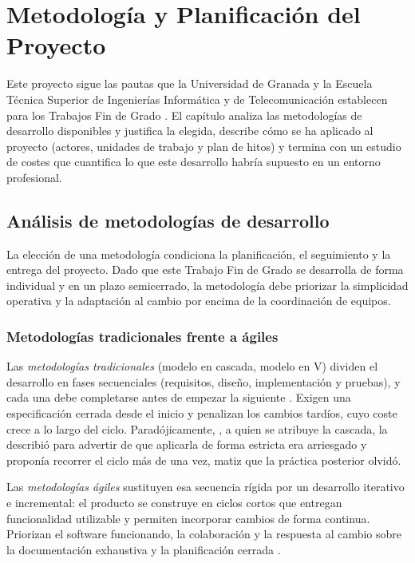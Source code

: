 \chapter{Metodología y Planificación del Proyecto}
\label{cap:metodologia}

Este proyecto sigue las pautas que la Universidad de Granada y la Escuela Técnica Superior de Ingenierías Informática y de Telecomunicación establecen para los Trabajos Fin de Grado \citep{GuiaTFG, GuillenPerales2025}. El capítulo analiza las metodologías de desarrollo disponibles y justifica la elegida, describe cómo se ha aplicado al proyecto (actores, unidades de trabajo y plan de hitos) y termina con un estudio de costes que cuantifica lo que este desarrollo habría supuesto en un entorno profesional.

\section{Análisis de metodologías de desarrollo}

La elección de una metodología condiciona la planificación, el seguimiento y la entrega del proyecto. Dado que este Trabajo Fin de Grado se desarrolla de forma individual y en un plazo semicerrado, la metodología debe priorizar la simplicidad operativa y la adaptación al cambio por encima de la coordinación de equipos.

\subsection{Metodologías tradicionales frente a ágiles}

Las \textit{metodologías tradicionales} (modelo en cascada, modelo en V) dividen el desarrollo en fases secuenciales (requisitos, diseño, implementación y pruebas), y cada una debe completarse antes de empezar la siguiente \citep{Sommerville2016}. Exigen una especificación cerrada desde el inicio y penalizan los cambios tardíos, cuyo coste crece a lo largo del ciclo. Paradójicamente, \textcite{Royce1970}, a quien se atribuye la cascada, la describió para advertir de que aplicarla de forma estricta era arriesgado y proponía recorrer el ciclo más de una vez, matiz que la práctica posterior olvidó.

Las \textit{metodologías ágiles} sustituyen esa secuencia rígida por un desarrollo iterativo e incremental: el producto se construye en ciclos cortos que entregan funcionalidad utilizable y permiten incorporar cambios de forma continua. Priorizan el software funcionando, la colaboración y la respuesta al cambio sobre la documentación exhaustiva y la planificación cerrada \citep{AgileManifesto2001}.

